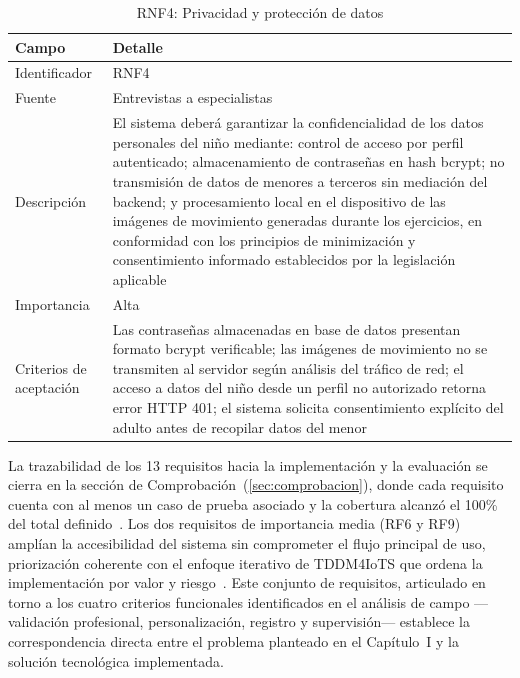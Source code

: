 					\begin{table}[H]
						\centering\small
						\caption{RNF4: Privacidad y protección de datos}
						\label{tab:rnf4}
						\begin{tabular}{p{3.5cm}p{11cm}}
							\hline
							\textbf{Campo} & \textbf{Detalle} \\
							\hline
							Identificador & RNF4 \\
							
							Fuente & Entrevistas a especialistas \\
							
							Descripción & El sistema deberá garantizar la confidencialidad de los datos personales del niño mediante: control de acceso por perfil autenticado; almacenamiento de contraseñas en hash bcrypt; no transmisión de datos de menores a terceros sin mediación del backend; y procesamiento local en el dispositivo de las imágenes de movimiento generadas durante los ejercicios, en conformidad con los principios de minimización y consentimiento informado establecidos por la legislación aplicable~\cite{LOPDP2021,GDPR2016} \\
							
							Importancia & Alta \\
							
							Criterios de aceptación & Las contraseñas almacenadas en base de datos presentan formato bcrypt verificable; las imágenes de movimiento no se transmiten al servidor según análisis del tráfico de red; el acceso a datos del niño desde un perfil no autorizado retorna error HTTP 401; el sistema solicita consentimiento explícito del adulto antes de recopilar datos del menor \\
							\hline
						\end{tabular}
					\end{table} \tblnote
					
					La trazabilidad de los 13 requisitos hacia la implementación y la evaluación se cierra en la sección de Comprobación~(\ref{sec:comprobacion}), donde cada requisito cuenta con al menos un caso de prueba asociado y la cobertura alcanzó el 100\% del total definido~\cite{Fowler2002}. Los dos requisitos de importancia media (RF6 y RF9) amplían la accesibilidad del sistema sin comprometer el flujo principal de uso, priorización coherente con el enfoque iterativo de TDDM4IoTS que ordena la implementación por valor y riesgo~\cite{GuerreroUlloa2024}. Este conjunto de requisitos, articulado en torno a los cuatro criterios funcionales identificados en el análisis de campo ---validación profesional, personalización, registro y supervisión--- establece la correspondencia directa entre el problema planteado en el Capítulo~I y la solución tecnológica implementada.
					

